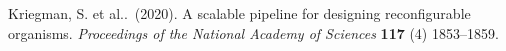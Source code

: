 \documentclass[12pt]{report}
\begin{document}
\vspace{1.5em}
\noindent
Kriegman, S. et al..~(2020).
A scalable pipeline for designing reconfigurable organisms. 
\textit{Proceedings of the National Academy of Sciences} 
\textbf{117} (4) 1853--1859.



\newpage







\tableofcontents
\newpage


\setcounter{page}{1}





% 







\newpage



\end{document}
